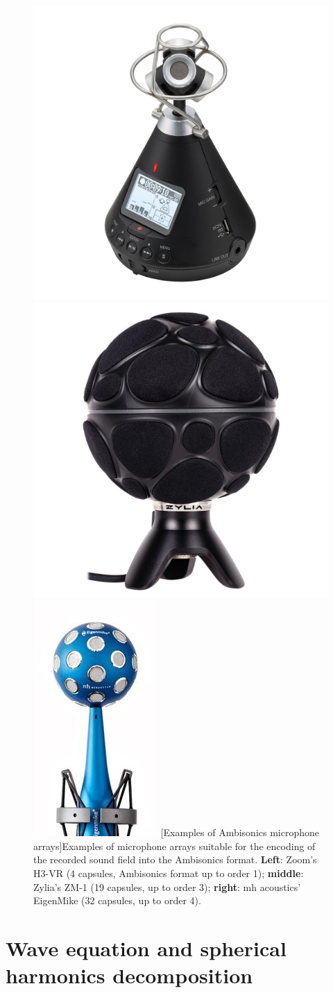 \begin{figure}[t]
    \begin{center}
    \includegraphics[width=0.35\linewidth]{Images/chap2/h3-vr.jpg}
    \includegraphics[width=0.35\linewidth]{Images/chap2/zm-1.jpg}
    \includegraphics[width=0.2\linewidth]{Images/chap2/eigenmike.jpg}
    [Examples of Ambisonics microphone arrays]{Examples of microphone arrays suitable for the encoding of the recorded sound field into the Ambisonics format. \textbf{Left}: Zoom's H3-VR (4 capsules, Ambisonics format up to order 1); \textbf{middle}: Zylia's ZM-1 (19 capsules, up to order 3); \textbf{right}: mh acoustics' EigenMike (32 capsules, up to order 4).}
    \label{fig:ambisonics_microphones}
    \end{center}
\end{figure}

\section{Wave equation and spherical harmonics decomposition}

